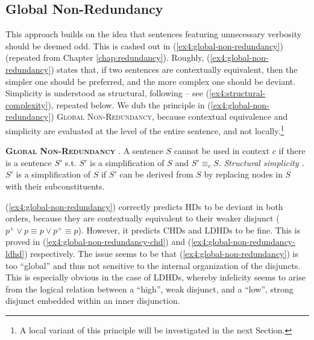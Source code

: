 \subsection{Global Non-Redundancy}

This approach builds on the idea that sentences featuring unnecessary verbosity should be deemed odd. This is cashed out in (\ref{ex4:global-non-redundancy}) (repeated from Chapter \ref{chap:redundancy}). Roughly, (\ref{ex4:global-non-redundancy}) states that, if two sentences are contextually equivalent, then the simpler one should be preferred, and the more complex one should be deviant. Simplicity is understood as structural, following \citet{Katzir2007} -- see (\ref{ex4:structural-complexity}), repeated below. We dub the principle in (\ref{ex4:global-non-redundancy}) \textsc{Global Non-Redundancy}, because contextual equivalence and simplicity are evaluated at the level of the entire sentence, and not locally.\footnote{A local variant of this principle will be investigated in the next Section.}

\begin{exe}
	 {\textsc{\textbf{Global Non-Redundancy}} \citep{Meyer2013,Mayr2016}. A sentence $S$ cannot be used in context $c$ if there is a sentence $S'$ s.t. $S'$ is a simplification of $S$ and $S' \equiv_c S$.}
	 {\textit{Structural simplicity \citep{Katzir2007}.} $S'$ is a simplification of $S$ if $S'$ can be derived from $S$ by replacing nodes in $S$ with their subconstituents.}
\end{exe}


(\ref{ex4:global-non-redundancy}) correctly predicts HDs to be deviant in both orders, because they are contextually equivalent to their weaker disjunct ($p^+\vee p \equiv p\vee p^+ \equiv p$).
However, it predicts CHDs and LDHDs to be fine. This is proved in (\ref{ex4:global-non-redundancy-chd}) and (\ref{ex4:global-non-redundancy-ldhd}) respectively. The issue seems to be that (\ref{ex4:global-non-redundancy}) is too ``global'' and thus not sensitive to the internal organization of the disjuncts. This is especially obvious in the case of LDHDs, whereby infelicity seems to arise from the logical relation between a ``high'', weak disjunct, and a ``low'', strong disjunct embedded within an inner disjunction.

